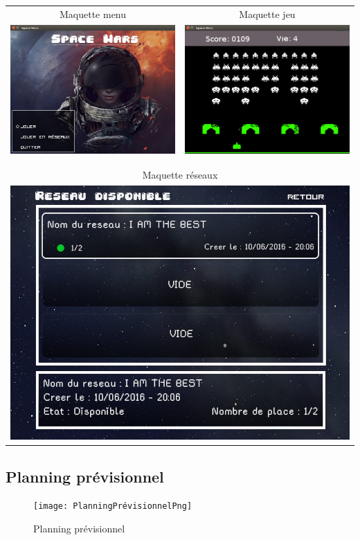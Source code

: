 \documentclass[french, 11pt]{article}
\begin{document}
			\begin{table}[h]
				\begin{center}
					\centering
					\begin{tabular}{cc}
						Maquette menu & Maquette jeu \\
						\includegraphics[width=0.5\linewidth]{Maquette1}
						&
						\includegraphics[width=0.5\linewidth]{Maquette2} \\
						&\\&\\
						\multicolumn{2}{c}{Maquette réseaux} \\
						\multicolumn{2}{c}{\includegraphics[width=0.5\linewidth]{MaquetteReseaux}}\\
					\end{tabular}
				\end{center}
			\end{table}
			\newpage
			\subsection{Planning prévisionnel}
			\begin{figure}[h]
				\centering
				\texttt{[image: PlanningPrévisionnelPng]}
				\caption{Planning prévisionnel}
			\end{figure}
\end{document}
